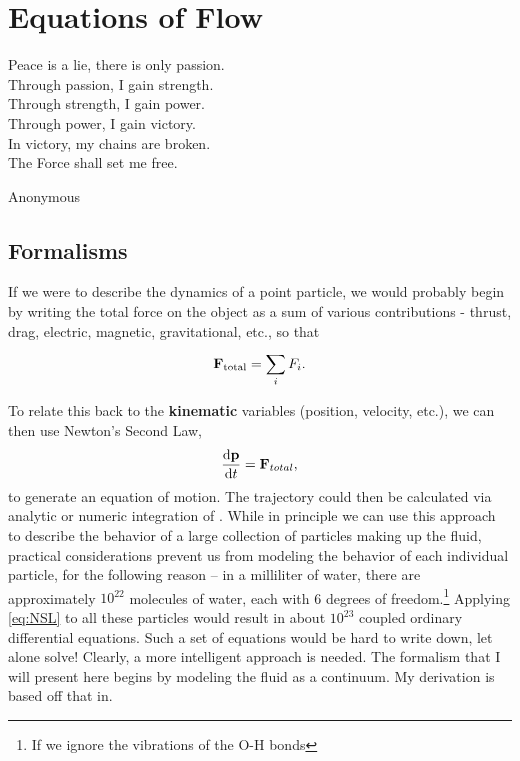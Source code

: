 \setcounter{secnumdepth}{3}
\chapter{Equations of Flow}
    	 	\epigraph{Peace is a lie, there is only passion. \\
			       Through passion, I gain strength.\\
			        Through strength, I gain power.\\
			        Through power, I gain victory.\\
			        In victory, my chains are broken.\\
                                        The Force shall set me free.}{Anonymous}
\section{Formalisms}
If we were to describe the dynamics of a point particle, we would probably begin by writing the total force on the object as a sum of various contributions - thrust, drag, electric, magnetic, gravitational, etc., so that 
\begin{equation}
\Vector{F}_{\mathrm{total}} = \sum{i}{}{F_{i}}.
\end{equation}

To relate this back to the {\bf kinematic} variables (position, velocity, etc.), we can then use Newton's Second Law,
\begin{equation}\label{eq:NSL}
\der{1}{\Vector{p}}{t} = \Vector{F}_{total},
\end{equation}
to generate an equation of motion. The trajectory could then be calculated via analytic or numeric integration of . While in principle we can use this approach to describe the behavior of a large collection of particles making up the fluid, practical considerations prevent us from modeling the behavior of each individual particle, for the following reason -- in a milliliter of water, there are approximately $10^{22}$ molecules of water, each with 6 degrees of freedom.\footnote{If we ignore the vibrations of the O-H bonds} Applying \eqref{eq:NSL} to all these particles would result in about $10^{23}$ coupled ordinary differential equations. Such a set of equations would be hard to write down, let alone solve! Clearly, a more intelligent approach is needed. The formalism that I will present here begins by modeling the fluid as a continuum. My derivation is based off that in. \\

